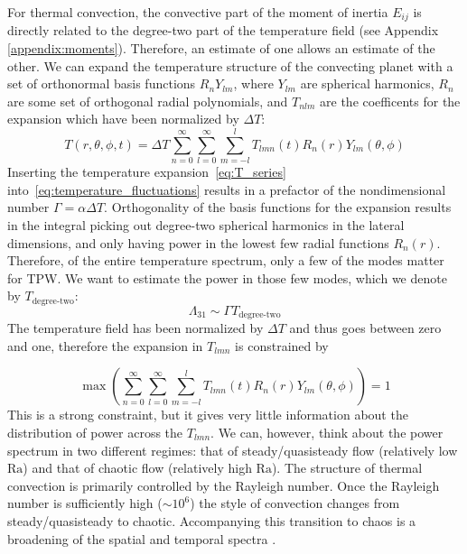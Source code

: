 \documentclass[extra,mreferee]{gji}
\begin{document}
For thermal convection, the convective part of the moment of inertia $E_{ij}$ is directly related to the degree-two part of the temperature field (see Appendix \ref{appendix:moments}).
Therefore, an estimate of one allows an estimate of the other.
We can expand the temperature structure of the convecting planet with a set of orthonormal basis functions $R_n Y_{lm}$, 
where $Y_{lm}$ are spherical harmonics, $R_n$ are some set of orthogonal radial polynomials, and
$T_{nlm}$ are the coefficents for the expansion which have been normalized by $\Delta T$:
\begin{equation} 
T( r , \theta, \phi, t )  = \Delta T {\displaystyle \sum_{n=0}^\infty \sum_{l=0}^\infty \sum_{m=-l}^{l} } T_{lmn}(t) R_n(r) Y_{lm} (\theta , \phi)
\label{eq:T_series}
\end{equation}
Inserting the temperature expansion~\eqref{eq:T_series} into~\eqref{eq:temperature_fluctuations} results in 
a prefactor of the nondimensional number $\Gamma = \alpha \Delta T$.
Orthogonality of the basis functions for the expansion results in the integral picking out degree-two 
spherical harmonics in the lateral dimensions, and only having power in the lowest few radial functions $R_n(r)$.
Therefore, of the entire temperature spectrum, only a few of the modes matter for TPW.
We want to estimate the power in those few modes, which we denote by $T_{\text{degree-two}}$: 
\begin{equation}
\Lambda_{31} \sim \Gamma T_{\text{degree-two}}
\end{equation}
The temperature field has been normalized by $\Delta T$ and thus goes between zero and one, therefore the expansion in $T_{lmn}$ is constrained by

\begin{equation}
\max \left( \displaystyle \sum_{n=0}^\infty \sum_{l=0}^\infty \sum_{m=-l}^{l} T_{lmn}(t) R_n(r) Y_{lm} (\theta , \phi) \right) = 1
\end{equation}
This is a strong constraint, but it gives very little information about the distribution of power across the $T_{lmn}$.  
We can, however, think about the power spectrum in two different regimes: that of steady/quasisteady flow (relatively low $\mathrm{Ra}$) and that of chaotic flow (relatively high $\mathrm{Ra}$).
The structure of thermal convection is primarily controlled by the Rayleigh number.  Once the Rayleigh number is sufficiently high ($\sim10^6$) 
the style of convection changes from steady/quasisteady to chaotic.  Accompanying this transition to chaos is a broadening of the spatial 
and temporal spectra \citep{mclaughlin1982transition}.  
\end{document}
